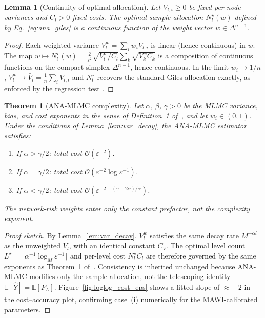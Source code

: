 \documentclass{ieeeaccess}
\newtheorem{theorem}{Theorem}
\newtheorem{lemma}{Lemma}
\begin{document}
\begin{lemma}[Continuity of optimal allocation]
\label{lem:continuity}
Let $V_{l,i} \ge 0$ be fixed per-node variances and $C_l > 0$ fixed costs.
The optimal sample allocation $N_l^{\star}(w)$ defined by Eq.~\eqref{eq:ana_giles} is a
continuous function of the weight vector $w \in \Delta^{n-1}$.
\end{lemma}
\begin{proof}
Each weighted variance $V_l^w = \sum_i w_i V_{l,i}$ is linear (hence continuous) in $w$.
The map $w \mapsto N_l^{\star}(w) = \tfrac{2}{\varepsilon^2}\sqrt{V_l^w/C_l}
\sum_k \sqrt{V_k^w C_k}$ is a composition of continuous functions on the compact
simplex $\Delta^{n-1}$, hence continuous.  In the limit $w_i \to 1/n$, $V_l^w \to
\bar V_l = \tfrac{1}{n}\sum_i V_{l,i}$ and $N_l^{\star}$ recovers the standard Giles
allocation exactly, as enforced by the regression test .
\end{proof}

\begin{theorem}[ANA-MLMC complexity]
\label{thm:complexity}
Let $\alpha$, $\beta$, $\gamma > 0$ be the MLMC variance, bias, and cost exponents in the
sense of Definition~1 of~\cite{giles2015multilevel}, and let $w_i \in (0,1)$.
Under the conditions of Lemma~\ref{lem:var_decay}, the ANA-MLMC estimator satisfies:
\begin{enumerate}
  \item[{\rm (i)}] If $\alpha > \gamma/2$: total cost $\mathcal{O}(\varepsilon^{-2})$.
  \item[{\rm (ii)}] If $\alpha = \gamma/2$: total cost $\mathcal{O}(\varepsilon^{-2}\log\varepsilon^{-1})$.
  \item[{\rm (iii)}] If $\alpha < \gamma/2$: total cost
    $\mathcal{O}\!\left(\varepsilon^{-2-(\gamma-2\alpha)/\alpha}\right)$.
\end{enumerate}
The network-risk weights enter only the constant prefactor, not the complexity exponent.
\end{theorem}
\begin{proof}[Proof sketch]
By Lemma~\ref{lem:var_decay}, $V_l^w$ satisfies the same decay rate $M^{-\alpha l}$ as the
unweighted $V_l$, with an identical constant $C_V$.  The optimal level count
$L^{\star} = \lceil \alpha^{-1} \log_M \varepsilon^{-1} \rceil$ and per-level cost
$N_l^{\star} C_l$ are therefore governed by the same exponents as Theorem~1
of~\cite{giles2015multilevel}.  Consistency is inherited unchanged because ANA-MLMC modifies
only the sample allocation, not the telescoping identity
$\mathbb{E}[\hat Y] = \mathbb{E}[P_L]$.
Figure~\ref{fig:loglog_cost_eps} shows a fitted slope of ${\approx}\,{-2}$ in the
cost--accuracy plot, confirming case~(i) numerically for the MAWI-calibrated parameters.
\end{proof}
\end{document}
